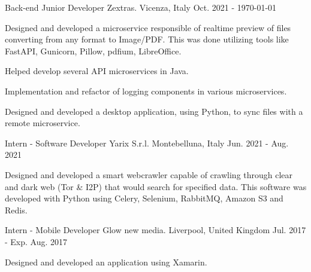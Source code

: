 

\begin{cventries}

  \cventry
    {Back-end Junior Developer} %
    {Zextras.} %
    {Vicenza, Italy} %
    {Oct. 2021 - \today{}} %
    {
      \begin{cvitems} %
        \item {Designed and developed a microservice responsible of realtime preview of files converting from any format to Image/PDF. This was done utilizing tools like FastAPI, Gunicorn, Pillow, pdfium, LibreOffice.}
        \item {Helped develop several API microservices in Java.}
        \item {Implementation and refactor of logging components in various microservices.}
        \item {Designed and developed a desktop application, using Python, to sync files with a remote microservice.}
      \end{cvitems}
    }

  \cventry
    {Intern - Software Developer} %
    {Yarix S.r.l.} %
    {Montebelluna, Italy} %
    {Jun. 2021 - Aug. 2021} %
    {
      \begin{cvitems} %
        \item {Designed and developed a smart webcrawler capable of crawling through clear and dark web (Tor \& I2P) that would search for specified data. This software was developed with Python using Celery, Selenium, RabbitMQ, Amazon S3 and Redis.}
      \end{cvitems}
    }

  \cventry
    {Intern - Mobile Developer} %
    {Glow new media.} %
    {Liverpool, United Kingdom} %
    {Jul. 2017 - Exp. Aug. 2017} %
    {
      \begin{cvitems} %
        \item {Designed and developed an application using Xamarin.}
      \end{cvitems}
    }


\end{cventries}
